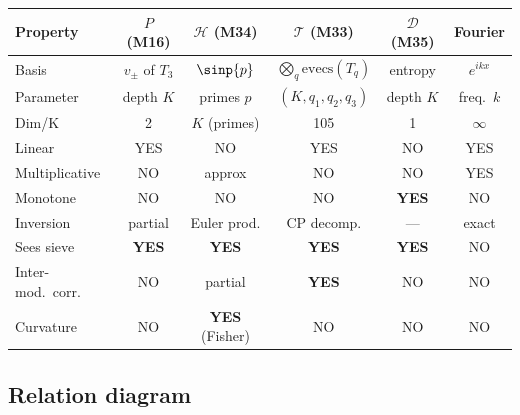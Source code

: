 \documentclass[12pt,a4paper]{article}
\begin{document}
\begin{center}
\small
\begin{tabular}{lccccc}
\toprule
\textbf{Property} & $P$ (M16) & $\mathcal{H}$ (M34) &
  $\mathcal{T}$ (M33) & $\mathcal{D}$ (M35) & Fourier \\
\midrule
Basis & $v_\pm$ of $T_3$ & $\sinp{p}$ &
  $\bigotimes_q \mathrm{evecs}(T_q)$ & entropy & $e^{ikx}$ \\
Parameter & depth $K$ & primes $p$ & $(K, q_1, q_2, q_3)$ &
  depth $K$ & freq.\ $k$ \\
Dim/K & 2 & $K$ (primes) & 105 & 1 & $\infty$ \\
Linear & YES & NO & YES & NO & YES \\
Multiplicative & NO & approx & NO & NO & YES \\
Monotone & NO & NO & NO & \textbf{YES} & NO \\
Inversion & partial & Euler prod. & CP decomp. & --- & exact \\
Sees sieve & \textbf{YES} & \textbf{YES} & \textbf{YES} &
  \textbf{YES} & NO \\
Inter-mod.\ corr. & NO & partial & \textbf{YES} & NO & NO \\
Curvature & NO & \textbf{YES} (Fisher) & NO & NO & NO \\
\bottomrule
\end{tabular}
\end{center}


\subsection*{Relation diagram}
\end{document}
